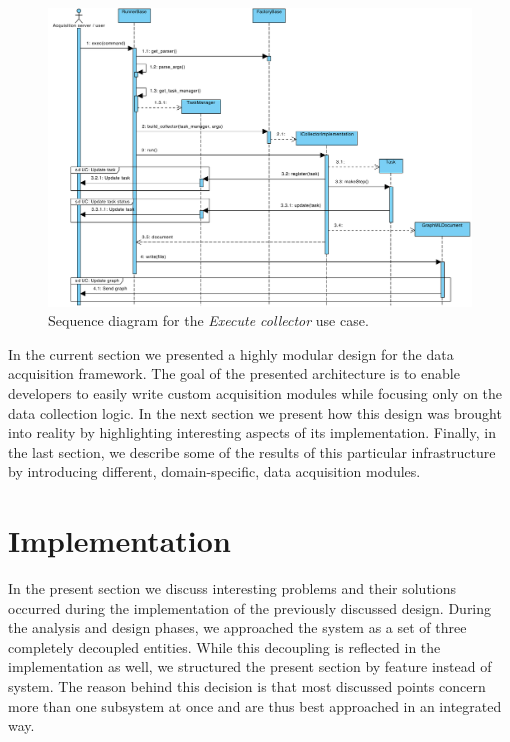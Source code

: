 \begin{figure}
  \begin{adjustwidth}{-11.6mm}{-2cm}
    \includegraphics[width=\linewidth]{images/diagrams/seq-execute-collector}
  \end{adjustwidth}
  \caption{Sequence diagram for the \emph{Execute collector} use case.}
  \label{fig:seq-execute-collector}
\end{figure}

In the current section we presented a highly modular design for the data acquisition framework. The goal of the presented architecture is to enable developers to easily write custom acquisition modules while focusing only on the data collection logic. In the next section we present how this design was brought into reality by highlighting interesting aspects of its implementation. Finally, in the last section, we describe some of the results of this particular infrastructure by introducing different, domain-specific, data acquisition modules.

\section{Implementation}

In the present section we discuss interesting problems and their solutions occurred during the implementation of the previously discussed design. During the analysis and design phases, we approached the system as a set of three completely decoupled entities. While this decoupling is reflected in the implementation as well, we structured the present section by feature instead of system. The reason behind this decision is that most discussed points concern more than one subsystem at once and are thus best approached in an integrated way.


